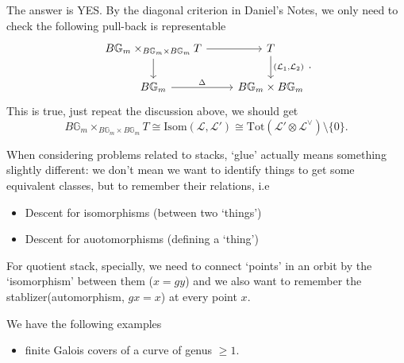 \documentclass[main.tex]{subfiles}
\begin{document}
\begin{remark}
The answer is YES. By the diagonal criterion in Daniel's Notes, we only need to check the following pull-back is representable
$$\begin{tikzcd}
B\mathbb{G}_{m}\times_{B\mathbb{G}_{m}\times B\mathbb{G}_{m}}T\arrow{r}\arrow{d} & T\arrow{d}{(\mathcal{L}_{1}, \mathcal{L}_{2})}\\
B\mathbb{G}_{m}\arrow{r}{\Delta}& B\mathbb{G}_{m}\times B\mathbb{G}_{m}\end{tikzcd}.$$
This is true, just repeat the discussion above, we should get 
$$B\mathbb{G}_{m}\times_{B\mathbb{G}_{m}\times B\mathbb{G}_{m}}T\cong \mathrm{Isom}(\mathcal{L},\mathcal{L}')\cong \mathrm{Tot}(\mathcal{L}'\otimes \mathcal{L}^{\vee})\setminus\{0\}.$$
\end{remark}
\begin{remark}[`glue']
When considering problems related to stacks, `glue' actually means something slightly different: we don't mean we want to identify things to get some equivalent classes, but to remember their relations, i.e 
\begin{itemize}
\item Descent for isomorphisms (between two `things')
\item Descent for auotomorphisms (defining a `thing')
\end{itemize}
For quotient stack, specially, we need to connect `points' in an orbit by the `isomorphism' between them ($x=gy$) and we also want to remember the stablizer(automorphism, $gx=x$) at every point $x$.
\end{remark}




\begin{example}
We have the following examples
\begin{itemize}
\item finite Galois covers of a curve of genus $\geq 1$.
\end{itemize}
\end{example}
\end{document}
